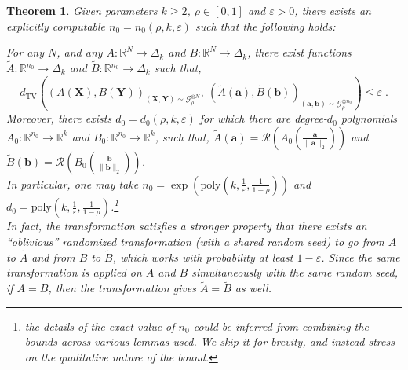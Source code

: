 \documentclass[11pt]{article}
\newcommand{\inparen}[1]{\left ( #1 \right )}
\newcommand{\wtilde}[1]{\widetilde{#1}}
\newcommand{\dTV}{d_{\mathrm{TV}}}
\newcommand{\eps}{\varepsilon}
\newcommand{\bbR}{{\mathbb R}}
\newcommand{\ba}{{\bm a}}
\newcommand{\bb}{{\bm b}}
\newcommand{\bX}{\mathbf{X}}
\newcommand{\bY}{\mathbf{Y}}
\newcommand{\calG}{\mathcal{G}}
\newcommand{\calR}{\mathcal{R}}
\newcommand{\poly}{\mathrm{poly}}
\newtheorem{theorem}{Theorem}[section]
\begin{document}
\begin{theorem}\label{thm:gaussian-non-int-sim}
	Given parameters $k \ge 2$, $\rho \in [0,1]$ and $\eps > 0$, there exists an explicitly computable $n_0 = n_0(\rho, k, \eps)$ such that the following holds:

	\noindent For any $N$, and any $A : \bbR^N \to \Delta_k$ and $B : \bbR^N \to \Delta_k$, there exist functions $\wtilde{A} : \bbR^{n_0} \to \Delta_k$ and $\wtilde{B} : \bbR^{n_0} \to \Delta_k$ such that,
	\[\dTV\inparen{(A(\bX),B(\bY))_{(\bX,\bY)\sim \calG_\rho^{\otimes N}},\ (\wtilde{A}(\ba), \wtilde{B}(\bb))_{(\ba, \bb) \sim \calG_\rho^{\otimes n_0}}} \le \eps\;.\]
	Moreover, there exists $d_0 = d_0(\rho, k, \eps)$ for which there are degree-$d_0$ polynomials $A_0 : \bbR^{n_0} \to \bbR^k$ and $B_0 : \bbR^{n_0} \to \bbR^k$, such that, $\wtilde{A}(\ba) = \calR\inparen{A_0\inparen{\frac{\ba}{\|\ba\|_2}}}$ and $\wtilde{B}(\bb) = \calR\inparen{B_0\inparen{\frac{\bb}{\|\bb\|_2}}}$.\\
	In particular, one may take $n_0 = \exp \inparen{\poly\inparen{k, \frac{1}{\eps}, \frac{1}{1-\rho}}}$ and $d_0 = \poly\inparen{k, \frac{1}{\eps}, \frac{1}{1-\rho}}$.\footnote{the details of the exact value of $n_0$ could be inferred from combining the bounds across various lemmas used. We skip it for brevity, and instead stress on the qualitative nature of the bound.}\\%
	
	\noindent In fact, the transformation satisfies a stronger property that there exists an ``oblivious'' randomized transformation (with a shared random seed) to go from $A$ to $\wtilde{A}$ and from $B$ to $\wtilde{B}$, which works with probability at least $1-\eps$. Since the same transformation is applied on $A$ and $B$ simultaneously with the same random seed, if $A = B$, then the transformation gives $\wtilde{A}=\wtilde{B}$ as well.
	

\end{theorem}
\end{document}
